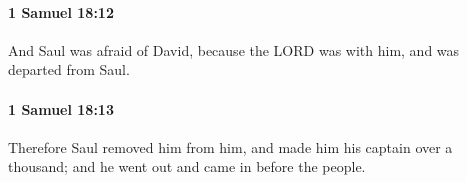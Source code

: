 		\paragraph{1 Samuel 18:12} %
			\label{1SAMUEL-18-12}

			And Saul was afraid of David, because the LORD was with him, and was departed from Saul.


		\paragraph{1 Samuel 18:13} %
			\label{1SAMUEL-18-13}

			Therefore Saul removed him from him, and made him his captain over a thousand; and he went out and came in before the people.


